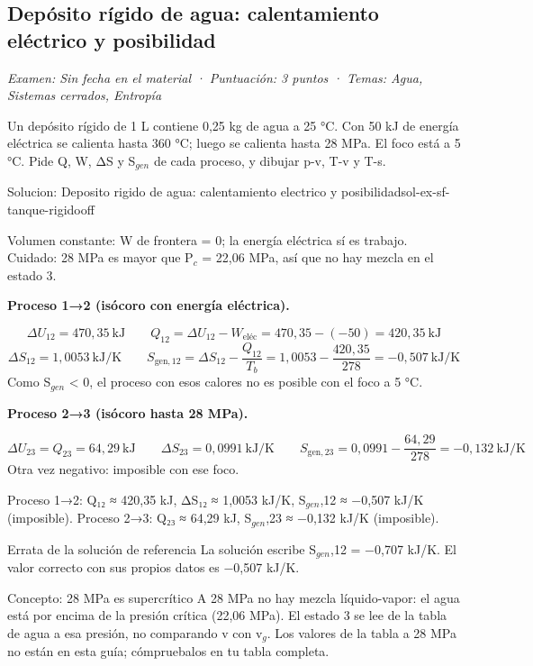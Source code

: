 \documentclass[11pt,a4paper]{article}
\begin{document}
\subsection{Depósito rígido de agua: calentamiento eléctrico y posibilidad}
\noindent\textit{Examen: Sin fecha en el material · Puntuación: 3 puntos · Temas: Agua, Sistemas cerrados, Entropía}\par\medskip

Un depósito rígido de 1 L contiene 0,25 kg de agua a 25 °C. Con 50 kJ de energía eléctrica se calienta hasta 360 °C; luego se calienta hasta 28 MPa. El foco está a 5 °C. Pide Q, W, ΔS y S$_{gen}$ de cada proceso, y dibujar p-v, T-v y T-s.

\begin{ocg}{Solucion: Deposito rigido de agua: calentamiento electrico y posibilidad}{sol-ex-sf-tanque-rigido}{off}
\begin{antesbox}
Volumen constante: W de frontera = 0; la energía eléctrica sí es trabajo. Cuidado: 28 MPa es mayor que P$_{c}$ = 22,06 MPa, así que no hay mezcla en el estado 3.
\end{antesbox}

\par\medskip\noindent\textbf{Proceso 1→2 (isócoro con energía eléctrica).}\par
\[\Delta U_{12} = 470{,}35\ \text{kJ} \qquad Q_{12} = \Delta U_{12} - W_{\text{eléc}} = 470{,}35 - (-50) = 420{,}35\ \text{kJ}\]   \[\Delta S_{12} = 1{,}0053\ \text{kJ/K} \qquad S_{\text{gen},12} = \Delta S_{12} - \frac{Q_{12}}{T_b} = 1{,}0053 - \frac{420{,}35}{278} = -0{,}507\ \text{kJ/K}\]  Como S$_{gen}$ < 0, el proceso con esos calores no es posible con el foco a 5 °C.

\par\medskip\noindent\textbf{Proceso 2→3 (isócoro hasta 28 MPa).}\par
\[\Delta U_{23} = Q_{23} = 64{,}29\ \text{kJ} \qquad \Delta S_{23} = 0{,}0991\ \text{kJ/K} \qquad S_{\text{gen},23} = 0{,}0991 - \frac{64{,}29}{278} = -0{,}132\ \text{kJ/K}\]  Otra vez negativo: imposible con ese foco.

\begin{resbox}
Proceso 1→2: Q₁₂ ≈ 420,35 kJ, ΔS₁₂ ≈ 1,0053 kJ/K, S$_{gen}$,12 ≈ −0,507 kJ/K (imposible). Proceso 2→3: Q₂₃ ≈ 64,29 kJ, S$_{gen}$,23 ≈ −0,132 kJ/K (imposible).
\end{resbox}

\begin{ojobox}{Errata de la solución de referencia}
La solución escribe S$_{gen}$,12 = −0,707 kJ/K. El valor correcto con sus propios datos es −0,507 kJ/K.
\end{ojobox}

\begin{ojobox}{Concepto: 28 MPa es supercrítico}
A 28 MPa no hay mezcla líquido-vapor: el agua está por encima de la presión crítica (22,06 MPa). El estado 3 se lee de la tabla de agua a esa presión, no comparando v con v$_{g}$. Los valores de la tabla a 28 MPa no están en esta guía; cómpruebalos en tu tabla completa.
\end{ojobox}

\hspace{0pt}\end{ocg}
\end{document}
